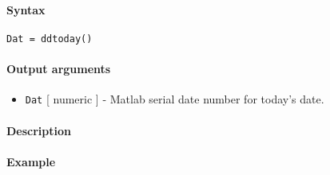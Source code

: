 


	\paragraph{Syntax}

\begin{verbatim}
Dat = ddtoday()
\end{verbatim}

\paragraph{Output arguments}

\begin{itemize}
\itemsep1pt\parskip0pt
\item
  \texttt{Dat} {[} numeric {]} - Matlab serial date number for today's
  date.
\end{itemize}

\paragraph{Description}

\paragraph{Example}


